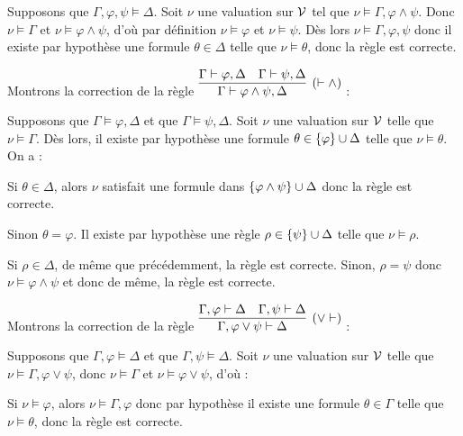 \documentclass[a4paper,french,bookmarks]{article}
\begin{document}
\begin{enumerate}
{\begin{enumerate}
                Supposons que $\Gamma, \varphi, \psi \vDash \Delta$. Soit $\nu$ une valuation sur $\mathcal{V}$ tel que $\nu \vDash \Gamma, \varphi \land \psi$. Donc $\nu \vDash \Gamma$ et $\nu \vDash \varphi \land \psi$, d'où par définition $\nu \vDash \varphi$ et $\nu \vDash \psi$. Dès lors $\nu \vDash \Gamma, \varphi, \psi$ donc il existe par hypothèse une formule $\theta \in \Delta$ telle que $\nu \vDash \theta$, donc la règle est correcte.\medskip
                
                \itt Montrons la correction de la règle $\infer[(\vdash \land)]{\Gamma \vdash \varphi \land \psi, \Delta}{\Gamma \vdash \varphi, \Delta & \Gamma \vdash \psi, \Delta}$ :
                
                Supposons que $\Gamma \vDash \varphi, \Delta$ et que $\Gamma \vDash \psi, \Delta$. Soit $\nu$ une valuation sur $\mathcal{V}$ telle que $\nu \vDash \Gamma$. Dès lors, il existe par hypothèse une formule $\theta \in \left\{\varphi\right\} \cup \Delta$ telle que $\nu \vDash \theta$. On a :
                \begin{enumerate}
                    \ithand Si $\theta \in \Delta$, alors $\nu$ satisfait une formule dans $\left\{\varphi \land \psi\right\} \cup \Delta$ donc la règle est correcte.
                    
                    \ithand Sinon $\theta = \varphi$. Il existe par hypothèse une règle $\rho \in \left\{\psi\right\} \cup \Delta$ telle que $\nu \vDash \rho$.
                    
                    \ithand Si $\rho \in \Delta$, de même que précédemment, la règle est correcte. Sinon, $\rho = \psi$ donc $\nu \vDash \varphi \land \psi$ et donc de même, la règle est correcte.
                \end{enumerate}
                \medskip
            
                \itt Montrons la correction de la règle $\infer[(\lor \vdash)]{\Gamma, \varphi \lor \psi \vdash \Delta}{\Gamma, \varphi \vdash \Delta & \Gamma, \psi \vdash \Delta}$ :
                
                Supposons que $\Gamma, \varphi \vDash \Delta$ et que $ \Gamma, \psi \vDash \Delta$. Soit $\nu$ une valuation sur $\mathcal{V}$ telle que $\nu \vDash \Gamma, \varphi \lor \psi$, donc $\nu \vDash \Gamma$ et $\nu \vDash \varphi \lor \psi$, d'où :
                \begin{enumerate}
                    \ithand Si $\nu \vDash \varphi$, alors $\nu \vDash \Gamma, \varphi$ donc par hypothèse il existe une formule $\theta \in \Gamma$ telle que $\nu \vDash \theta$, donc la règle est correcte.
                    

\end{enumerate}
\end{enumerate}}
\end{enumerate}
\end{document}
